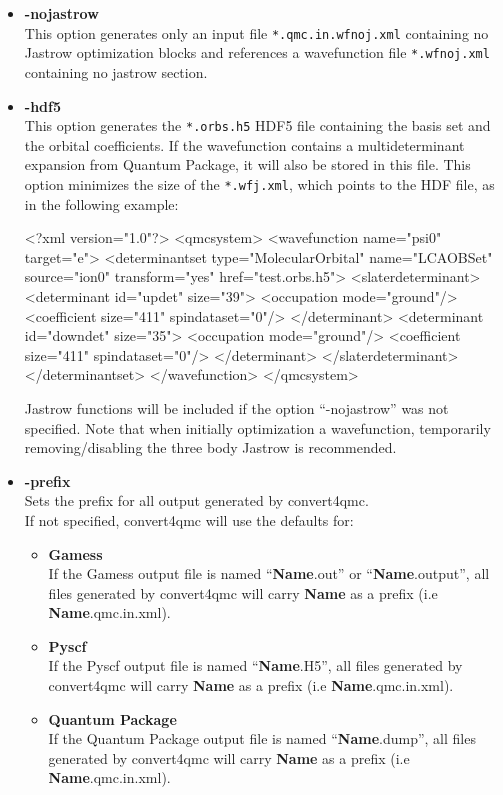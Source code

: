 \begin{itemize}
\item \textbf{-nojastrow}\\
This option generates only an input file \texttt{*.qmc.in.wfnoj.xml} containing no Jastrow optimization blocks and references a wavefunction file \texttt{*.wfnoj.xml} containing no jastrow section.

\item \textbf{-hdf5}\\
This option generates the \texttt{*.orbs.h5} HDF5 file containing the basis set and the orbital coefficients. If the wavefunction contains a multideterminant expansion from Quantum Package, it will also be stored in this file. This option minimizes the size of the \texttt{*.wfj.xml}, which points to the HDF file, as in the following example: 

\begin{shade}
 <?xml version="1.0"?>
<qmcsystem>
  <wavefunction name="psi0" target="e">
    <determinantset type="MolecularOrbital" name="LCAOBSet" source="ion0"
       transform="yes" href="test.orbs.h5">
      <slaterdeterminant>
        <determinant id="updet" size="39">
          <occupation mode="ground"/>
          <coefficient size="411" spindataset="0"/>
        </determinant>
        <determinant id="downdet" size="35">
          <occupation mode="ground"/>
          <coefficient size="411" spindataset="0"/>
        </determinant>
      </slaterdeterminant>
    </determinantset>
  </wavefunction>
</qmcsystem>

\end{shade}

Jastrow functions will be included if the option ``-nojastrow'' was
not specified. Note that when initially optimization a wavefunction,
temporarily removing/disabling the three body Jastrow is recommended.

\item \textbf{-prefix}\\
Sets the prefix for all output generated by convert4qmc. \\
If not specified, convert4qmc will use the defaults for:\\
\begin{itemize}
 \item \textbf{Gamess}\\
If the Gamess output file  is named ``\textbf{Name}.out'' or ``\textbf{Name}.output'', all files generated by convert4qmc will carry \textbf{Name} as a prefix (i.e \textbf{Name}.qmc.in.xml).\\ 
\item \textbf{Pyscf}\\
If the Pyscf output file  is named ``\textbf{Name}.H5'', all files generated by convert4qmc will carry \textbf{Name} as a prefix (i.e \textbf{Name}.qmc.in.xml).\\ 
\item \textbf{Quantum Package}\\
If the Quantum Package output file  is named ``\textbf{Name}.dump'', all files generated by convert4qmc will carry \textbf{Name} as a prefix (i.e \textbf{Name}.qmc.in.xml).\\ 


\end{itemize}
\end{itemize}
